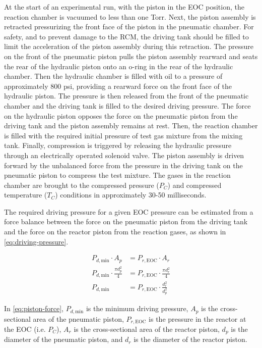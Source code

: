 \documentclass[12pt, letterpaper]{article}
\begin{document}
At the start of an experimental run, with the piston in the
EOC position, the reaction chamber is vacuumed to less
than one Torr. Next, the piston assembly is retracted pressurizing
the front face of the piston in the pneumatic chamber.
For safety, and to prevent damage to the RCM, the driving tank should
be filled to limit the acceleration of the piston assembly during this
retraction.
The pressure on the front of the pneumatic piston pulls the
piston assembly rearward and seats the rear of the
hydraulic piston onto an o-ring in the rear of the
hydraulic chamber. Then the hydraulic chamber is filled with oil to
a pressure of approximately 800 psi, providing a rearward force on the
front face of the hydraulic piston. The pressure is then released from
the front of the pneumatic chamber and the driving tank is filled to
the desired driving pressure. The
force on the hydraulic piston opposes the force on the pneumatic piston
from the driving tank and the piston assembly remains at rest. Then, the
reaction chamber is filled with the required initial pressure of test
gas mixture from the mixing tank. Finally, compression is triggered by
releasing the hydraulic pressure through an electrically operated solenoid
valve. The piston assembly is driven forward by the unbalanced force from
the pressure in the driving tank on the pneumatic piston
to compress the test mixture. The gases
in the reaction chamber are brought to the compressed pressure ($P_C$) and
compressed temperature ($T_C$) conditions in approximately 30-50
milliseconds.

The required driving pressure for a given EOC pressure can be estimated
from a force balance between the force on the pneumatic piston from the
driving tank and the force on the reactor piston from the reaction gases,
as shown in \autoref{eq:driving-pressure}.

\begin{subequations}
\label{eq:piston-force}
\begin{align}
    P_{d,\text{min}} \cdot A_p &= P_{r,\text{EOC}} \cdot A_r \\
    P_{d,\text{min}} \cdot \frac{\pi d_p^2}{4} &= P_{r,\text{EOC}} \cdot \frac{\pi d_r^2}{4} \\
    P_{d,\text{min}} &= P_{r,\text{EOC}} \cdot \frac{d_r^2}{d_p^2} \label{eq:driving-pressure}
\end{align}
\end{subequations}

In \autoref{eq:piston-force}, $P_{d,\text{min}}$ is the minimum
driving pressure, $A_p$ is the cross-sectional area of the pneumatic piston,
$P_{r,\text{EOC}}$ is the pressure in the reactor at the EOC (i.e. $P_C$),
$A_r$ is the cross-sectional area of the reactor piston, $d_p$ is the diameter
of the pneumatic piston, and $d_r$ is the diameter of the reactor piston.
\end{document}
